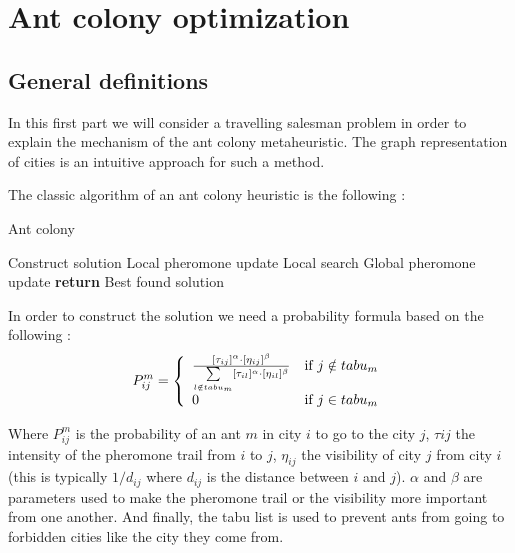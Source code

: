 \documentclass[UTF8, twoside]{EPURapport}
\begin{document}
\chapter{Ant colony optimization}

\section{General definitions}

 	\hspace{4ex}In this first part we will consider a travelling salesman problem in order to explain the mechanism of the ant colony metaheuristic. The graph representation of cities is an intuitive approach for such a method.
	
	
	The classic algorithm of an ant colony heuristic is the following :

\begin{algorithm}
  \caption{Ant colony}
  \begin{algorithmic}[1]
        	\State Construct solution
			\State Local pheromone update
        \EndFor
        \State Local search
        \State Global pheromone update
      \EndFor
      \State \textbf{return} Best found solution
  \end{algorithmic}
\end{algorithm}

	In order to construct the solution we need a probability formula based on the following :
	\\

\[
P^m_{ij}= \left\{ 
\begin{array}{l r}
\frac{[\tau_{ij}]^\alpha \cdot [\eta_{ij}]^\beta}{\underset{l\notin tabu_m}{\sum}[\tau_{il}]^\alpha \cdot [\eta_{il}]^\beta} & \text{if } j\notin tabu_m\\
0 & \text{if } j\in tabu_m
\end{array}
\right.
\]

	Where $P^m_{ij}$ is the probability of an ant $m$ in city $i$ to go to the city $j$, $\tau{ij}$ the intensity of the pheromone trail from $i$ to $j$, $\eta_{ij}$  the visibility of city $j$ from city $i$ (this is typically $1/d_{ij}$ where $d_{ij}$ is the distance between $i$ and $j$). $\alpha$ and $\beta$ are parameters used to make the pheromone trail or the visibility more important from one another. And finally, the tabu list is used to prevent ants from going to forbidden cities like the city they come from.
\\
\end{document}
